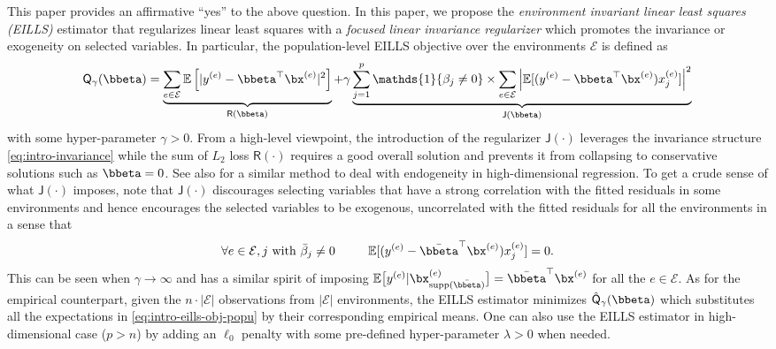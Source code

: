 \documentclass[10pt]{article}
\numberwithin{equation}{section}
\newcommand*{\supp}{\mathrm{supp}}
\begin{document}
{This paper provides an affirmative ``yes'' to the above question. In this paper, we propose the \emph{environment invariant linear least squares (EILLS)} estimator that regularizes linear least squares with a \emph{focused linear invariance regularizer} which promotes the invariance or exogeneity on selected variables. In particular, the population-level EILLS objective over the environments $\mathcal{E}$ is defined as
\begin{align}
\label{eq:intro-eills-obj-popu}
    \mathsf{Q}_\gamma(\bbeta) = \underbrace{\sum_{e\in \mathcal{E}} \mathbb{E} \left[|y^{(e)} - \bbeta^\top \bx^{(e)}|^2\right]}_{\mathsf{R}(\bbeta)} + \gamma \underbrace{\sum_{j=1}^p \mathds{1}\{\beta_j\neq 0\} \times  \sum_{e\in \mathcal{E}} \left|\mathbb{E} [(y^{(e)} - \bbeta^\top \bx^{(e)}) x_j^{(e)}]\right|^2 }_{\mathsf{J}(\bbeta)}
\end{align} with some hyper-parameter $\gamma>0$. From a high-level viewpoint, the introduction of the regularizer $\mathsf{J}(\cdot)$ leverages the invariance structure \eqref{eq:intro-invariance} while the sum of $L_2$ loss $\mathsf{R}(\cdot)$ requires a good overall solution and prevents it from collapsing to conservative solutions such as $\bbeta=0$.  See also \cite{fan2014endogeneity} for a similar method to deal with endogeneity in high-dimensional regression. To get a crude sense of what $\mathsf{J}(\cdot)$ imposes, note that $\mathsf{J}(\cdot)$ discourages selecting variables that have a strong correlation with the fitted residuals in some environments and hence encourages the selected variables to be exogenous, uncorrelated with the fitted residuals for all the environments in a sense that
\begin{align*}
    \forall e\in \mathcal{E}, j~\text{with}~\bar{\beta}_j\neq 0 ~~~~~~~~ \mathbb{E} [(y^{(e)} - \bar{\bbeta}^\top \bx^{(e)}) x_j^{(e)}] = 0.
\end{align*} 
This can be seen when $\gamma \to \infty$ and has a similar spirit of imposing $\mathbb{E}\big[y^{(e)} |\bx_{\supp(\bar{\bbeta})}^{(e)}\big]=\bar{\bbeta}^\top \bx^{(e)}$ for all the $e\in \mathcal{E}$. As for the empirical counterpart, given the $n \cdot |\mathcal{E}|$ observations from $|\mathcal{E}|$ environments, the EILLS estimator minimizes $\hat{\mathsf{Q}}_\gamma(\bbeta)$
which substitutes all the expectations in \eqref{eq:intro-eills-obj-popu} by their corresponding empirical means. One can also use the EILLS estimator in high-dimensional case ($p>n$) by adding an $\ell_0$ penalty with some pre-defined hyper-parameter $\lambda>0$ when needed.

}
\end{document}
